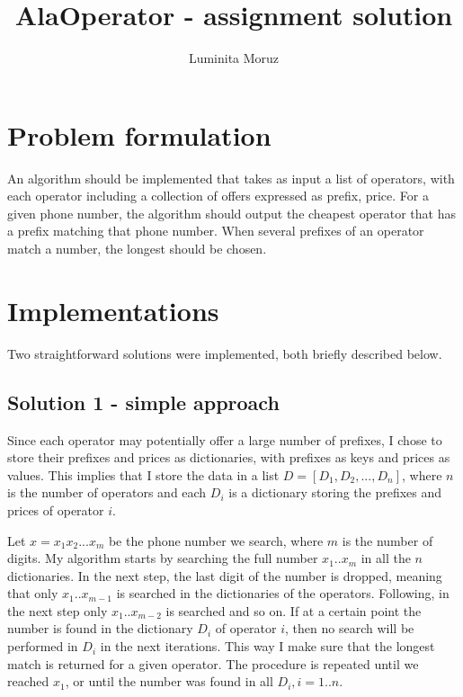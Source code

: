 \documentclass[12pt]{article}
\title{{\bf AlaOperator - assignment solution}}
\author{
Luminita Moruz  \\
}
\begin{document}
\maketitle

\section{Problem formulation}
\label{sec:problem}
An algorithm should be implemented that takes as input a list of
operators, with each operator including a collection of offers
expressed as prefix, price. For a given phone number, the algorithm
should output the cheapest operator that has a prefix matching that
phone number. When several prefixes of an operator match a number,
the longest should be chosen.
 
\section{Implementations}
Two straightforward solutions were implemented, both briefly described
below.

\subsection{Solution 1 - simple approach}
Since each operator may potentially offer a large number of prefixes,
I chose to store their prefixes and prices as dictionaries, with
prefixes as keys and prices as values. This implies that I store the
data in a list $D = [D_1, D_2, ..., D_n]$, where $n$ is the number of
operators and each $D_i$ is a dictionary storing the prefixes and
prices of operator $i$.

\vspace{0.2cm}

Let $x=x_1 x_2 ... x_m$ be the phone number we search, where $m$ is
the number of digits. My algorithm starts by searching the full number
$x_1 .. x_m$ in all the $n$ dictionaries. In the next step, the last
digit of the number is dropped, meaning that only $x_1 .. x_{m-1}$ is
searched in the dictionaries of the operators. Following, in the next
step only $x_1 .. x_{m-2}$ is searched and so on. If at a certain
point the number is found in the dictionary $D_i$ of operator $i$,
then no search will be performed in $D_i$ in the next iterations. This
way I make sure that the longest match is returned for a given
operator. The procedure is repeated until we reached $x_1$, or until
the number was found in all $D_i, i=1..n$.
\end{document}
